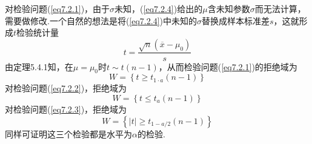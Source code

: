 对检验问题(\ref{eq7.2.1})，由于$\sigma$未知，(\ref{eq7.2.4})给出的$\mu $含未知参数$\sigma$而无法计算，需要做修改.一个自然的想法是将(\ref{eq7.2.4})中未知的$\sigma$替换成样本标准差$s$，这就形成$t$检验统计量
\begin{equation}\label{eq7.2.9}
t = \frac { \sqrt { n } \left( \overline { x } - \mu _ { 0 } \right) } { s }
\end{equation}
由定理5.4.1知，在$\mu=\mu_{ 0 }$时$t\sim t(n-1)$，从而检验问题(\ref{eq7.2.1})的拒绝域为
\begin{equation}\label{eq7.2.10}
W = \left\{ t \geq t _ { 1 \cdot a } ( n - 1 ) \right\}
\end{equation}
对检验问题(\ref{eq7.2.2})，拒绝域为
\begin{equation}\label{eq7.2.11}
W = \left\{ t \leq t _ { a } ( n - 1 ) \right\}
\end{equation}
对检验问题(\ref{eq7.2.3})，拒绝域为
\begin{equation}\label{eq7.2.12}
W=\left\{\left| t\right|\geq t_{1-a/2}\left(n-1\right)\right\}
\end{equation}
同样可证明这三个检验都是水平为$\alpha$的检验.

